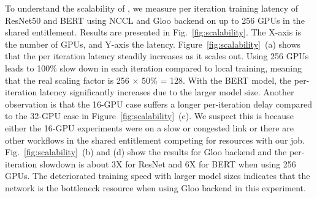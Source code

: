 To understand the scalability of , we measure per iteration training latency of ResNet50 and BERT using NCCL and Gloo backend on up to 256 GPUs in the shared entitlement. Results are presented in Fig.~\ref{fig:scalability}. The X-axis is the number of GPUs, and Y-axis the latency. Figure~\ref{fig:scalability}~(a) shows that the per iteration latency steadily increases as it scales out. Using 256 GPUs leads to 100\% slow down in each iteration compared to local training, meaning that the real scaling factor is 256 $\times$ 50\% = 128. With the BERT model, the per-iteration latency significantly increases due to the larger model size. Another observation is that the 16-GPU case suffers a longer per-iteration delay compared to the 32-GPU case in Figure~\ref{fig:scalability}~(c). We suspect this is because either the 16-GPU experiments were on a slow or congested link or there are other workflows in the shared entitlement competing for resources with our job. Fig.~\ref{fig:scalability}~(b) and (d) show the results for Gloo backend and the per-iteration slowdown is about 3X for ResNet and 6X for BERT when using 256 GPUs. The deteriorated training speed with larger model sizes indicates that the network is the bottleneck resource when using Gloo backend in this experiment. 





